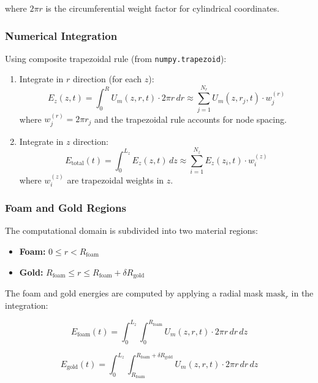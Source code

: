 \documentclass[11pt]{article}
\begin{document}
where $2\pi r$ is the circumferential weight factor for cylindrical coordinates.

\subsubsection{Numerical Integration}

Using composite trapezoidal rule (from \texttt{numpy.trapezoid}):

\begin{enumerate}
\item Integrate in $r$ direction (for each $z$):
\begin{equation}
E_z(z,t) = \int_0^{R} U_m(z,r,t) \cdot 2\pi r \, dr \approx \sum_{j=1}^{N_r} U_m(z,r_j,t) \cdot w_j^{(r)}
\end{equation}
where $w_j^{(r)} = 2\pi r_j$ and the trapezoidal rule accounts for node spacing.

\item Integrate in $z$ direction:
\begin{equation}
E_{\text{total}}(t) = \int_0^{L_z} E_z(z,t) \, dz \approx \sum_{i=1}^{N_z} E_z(z_i,t) \cdot w_i^{(z)}
\end{equation}
where $w_i^{(z)}$ are trapezoidal weights in $z$.
\end{enumerate}

\subsubsection{Foam and Gold Regions}

The computational domain is subdivided into two material regions:

\begin{itemize}
\item \textbf{Foam:} $0 \le r < R_{\text{foam}}$
\item \textbf{Gold:} $R_{\text{foam}} \le r \le R_{\text{foam}} + \delta R_{\text{gold}}$
\end{itemize}

\noindent The foam and gold energies are computed by applying a radial mask $\text{mask}_r$ in the integration:

\begin{equation}
E_{\text{foam}}(t) = \int_0^{L_z} \int_0^{R_{\text{foam}}} U_m(z,r,t) \cdot 2\pi r \, dr \, dz
\end{equation}

\begin{equation}
E_{\text{gold}}(t) = \int_0^{L_z} \int_{R_{\text{foam}}}^{R_{\text{foam}} + \delta R_{\text{gold}}} U_m(z,r,t) \cdot 2\pi r \, dr \, dz
\end{equation}
\end{document}
